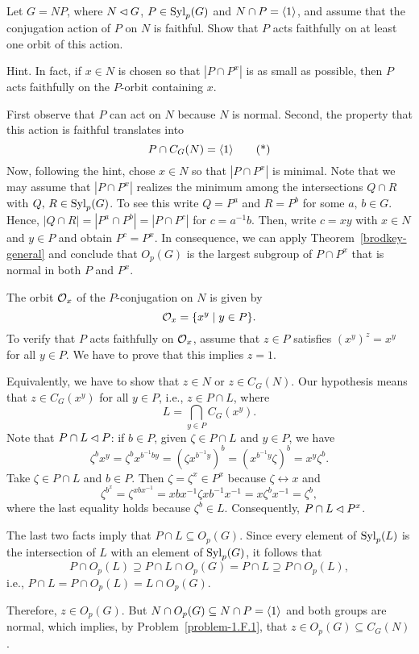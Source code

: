 \begin{probl}\label{problem-1.F.3}
    Let\/ $G=NP$, where\/ $N\lhd G$, $P\in{\rm Syl}_p(G)$ and\/ $N\cap P=\langle1\rangle$, and assume that the conjugation action of\/ $P$ on\/ $N$ is faithful. Show that\/ $P$ acts faithfully on at least one orbit of this action.

    \textrm{\rm Hint. In fact, if $x\in N$ is chosen so that $|P\cap P^x|$ is as small as possible, then $P$ acts faithfully on the $P$-orbit containing $x$.}
\end{probl}

\begin{solution} First observe that $P$ can act on $N$ because $N$ is normal. Second, the property that this action is faithful translates into
\begin{equation*}
    P\cap C_G(N)=\langle1\rangle\tag{*}
\end{equation*}
Now, following the hint, chose $x\in N$ so that $|P\cap P^x|$ is minimal. Note that we may assume that $|P\cap P^x|$ realizes the minimum among the intersections $Q\cap R$ with $Q,\,R\in{\rm Syl}_p(G)$. To see this write $Q=P^a$ and $R=P^b$ for some $a,\,b\in G$. Hence, $|Q\cap R|= |P^a\cap P^b|=|P\cap P^c|$ for $c=a^{-1}b$. Then, write $c=xy$ with $x\in N$ and $y\in P$ and obtain $P^c=P^x$. In consequence, we can apply Theorem~\ref{brodkey-general} and conclude that $O_p(G)$ is the largest subgroup of $P\cap P^x$ that is normal in both $P$ and $P^x$.

The orbit ${\cal O}_x$ of the $P$-conjugation on $N$ is given by
$$
    {\cal O}_x = \{x^y\mid y\in P\}.
$$
To verify that $P$ acts faithfully on ${\cal O}_x$, assume that $z\in P$ satisfies $(x^y)^z=x^y$ for all $y\in P$. We have to prove that this implies $z=1$. 

Equivalently, we have to show that $z\in N$ or $z\in C_G(N)$. Our hypothesis means that $z\in C_G(x^y)$ for all $y\in P$, i.e., $z\in P\cap L$, where
$$
    L = \bigcap_{y\in P}C_G(x^y).
$$
Note that $P\cap L\lhd P$: if $b\in P$, given $\zeta\in P\cap L$ and $y\in P$, we have
$$
    \zeta^bx^y = \zeta^bx^{b^{-1}by}=(\zeta x^{b^{-1}y})^b
        =(x^{b^{-1}y}\zeta)^b = x^y\zeta^b.
$$
Take $\zeta\in P\cap L$ and $b\in P$. Then $\zeta=\zeta^x\in P^x$ because $\zeta\leftrightarrow x$ and
$$
    \zeta^{b^x}=\zeta^{xbx^{-1}}=xbx^{-1}\zeta xb^{-1}x^{-1}
        = x\zeta^bx^{-1}=\zeta^b,
$$
where the last equality holds because $\zeta^b\in L$. Consequently, $P\cap L\lhd P^x$.

The last two facts imply that $P\cap L\subseteq O_p(G)$. Since every element of ${\rm Syl}_p(L)$ is the intersection of $L$ with an element of ${\rm Syl}_p(G)$, it follows that
$$
    P\cap O_p(L) \supseteq P\cap L\cap O_p(G) = P\cap L \supseteq P\cap O_p(L),
$$
i.e., $P\cap L=P\cap O_p(L)=L\cap O_p(G)$.

Therefore, $z\in O_p(G)$. But $N\cap O_p(G)\subseteq N\cap P=\langle1\rangle$ and both groups are normal, which implies, by Problem~\ref{problem-1.F.1}, that $z\in O_p(G)\subseteq C_G(N)$.  \end{solution}

